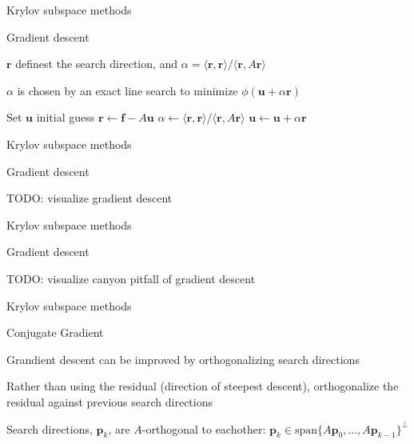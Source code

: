 \documentclass[18pt,xcolor=table]{beamer}
\begin{document}
\begin{frame}{Krylov subspace methods}
\begin{block}{Gradient descent}
\bit
\item $\mathbf{r}$ definest the search direction, and $\alpha = \langle \mathbf{r}, \mathbf{r} \rangle / \langle \mathbf{r}, A\mathbf{r} \rangle$
\item $\alpha$ is chosen by an exact line search to minimize $\phi(\mathbf{u} + \alpha \mathbf{r})$
\eit
\end{block}
\begin{algorithm}[H]
\caption{Gradient descent}
\begin{algorithmic}
\State Set $\mathbf{u}$ initial guess
\State $\mathbf{r} \leftarrow \mathbf{f} - A\mathbf{u}$
\State $\alpha \leftarrow \langle \mathbf{r}, \mathbf{r} \rangle / \langle \mathbf{r}, A\mathbf{r} \rangle$
\State $\mathbf{u} \leftarrow \mathbf{u} + \alpha\mathbf{r}$
\EndFor
\end{algorithmic}
\end{algorithm}
\end{frame}

\begin{frame}{Krylov subspace methods}
\begin{block}{Gradient descent}
\bit
\item TODO: visualize gradient descent
\eit
\end{block}
\end{frame}

\begin{frame}{Krylov subspace methods}
\begin{block}{Gradient descent}
\bit
\item TODO: visualize canyon pitfall of gradient descent
\eit
\end{block}
\end{frame}

\begin{frame}{Krylov subspace methods}
\begin{block}{Conjugate Gradient}
\bit
\item Grandient descent can be improved by orthogonalizing search directions
\item Rather than using the residual (direction of steepest descent), orthogonalize the residual against previous search directions
\item Search directions, $\mathbf{p}_k$, are $A$-orthogonal to eachother: $\mathbf{p}_k\in\text{span}\{A\mathbf{p}_0,...,A\mathbf{p}_{k-1}\}^\perp$
\eit
\end{block}
\end{frame}
\end{document}
